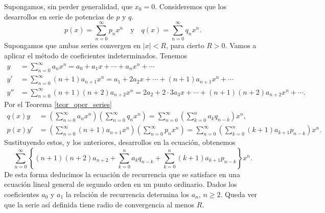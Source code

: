 \begin{demo}
Supongamos, sin perder generalidad, que $x_0=0$. Consideremos que los desarrollos en serie de potencias de $p$ y $q$.
\begin{equation}\label{eq:series_p_q}p(x)=\sum_{n=0}^{\infty}p_nx^n\quad\text{y}\quad q(x)=\sum_{n=0}^{\infty}q_nx^n.
\end{equation}
Supongamos que ambas series convergen en $|x|<R$, para cierto $R>0$. Vamos a aplicar el método de coeficientes indeterminados. Tenemos
\[
    \begin{split}
      y&=\sum_{n=0}^{\infty}a_nx^n=a_0+a_1x+\cdots+a_nx^n+\cdots\\
      y'&=\sum_{n=0}^{\infty}(n+1)a_{n+1}x^n=a_1+2a_2x+\cdots+(n+1)a_{n+1}x^n+\cdots\\
      y''&=\sum_{n=0}^{\infty}(n+1)(n+2)a_{n+2}x^n= 2a_2+2\cdot 3a_3x+\cdots+(n+1)(n+2)a_{n+2}x^n+\cdots.
    \end{split}
\]
Por el  Teorema \ref{teor_oper_series}
\[
   \begin{split}
     q(x)y&=\left(\sum_{n=0}^{\infty}a_nx^n\right)\left(\sum_{n=0}^{\infty}q_nx^n\right)=\sum_{n=0}^{\infty}\left(\sum_{k=0}^na_kq_{n-k}\right)x^n,\\
     p(x)y'&=\left(\sum_{n=0}^{\infty}(n+1)a_{n+1}x^n\right)\left(\sum_{n=0}^{\infty}p_nx^n\right)=\sum_{n=0}^{\infty}\left(\sum_{k=0}^n(k+1)a_{k+1}p_{n-k}\right)x^n.
   \end{split}
\]
Sustituyendo estos, y los anteriores, desarrollos en la ecuación, obtenemos
\[\sum_{n=0}^{\infty}\left\{ (n+1)(n+2)a_{n+2}+ \sum_{k=0}^na_kq_{n-k}+ \sum_{k=0}^n(k+1)a_{k+1}p_{n-k} \right\}x^n.\]
De esta forma deducimos la ecuación de recurrencia que se satisface en una ecuación lineal general de segundo orden en un punto ordinario.
Dados los coeficientes $a_0$ y $a_1$ la relación de recurrencia determina los $a_n$, $n\geq 2$. Queda ver que la serie así definida tiene radio de convergencia al menos $R$.


\end{demo}
